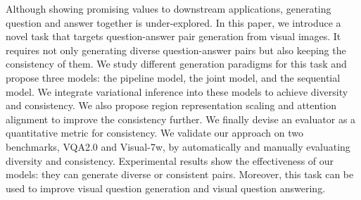 Although showing promising values to downstream applications, generating question and answer together is under-explored. In this paper, we introduce a novel task that targets question-answer pair generation from visual images. It requires not only generating diverse question-answer pairs but also keeping the consistency of them. We study different generation paradigms for this task and propose three models: the pipeline model, the joint model, and the sequential model. We integrate variational inference into these models to achieve diversity and consistency. We also propose region representation scaling and attention alignment to improve the consistency further. We finally devise an evaluator as a quantitative metric for consistency. We validate our approach on two benchmarks, VQA2.0 and Visual-7w, by automatically and manually evaluating diversity and consistency. Experimental results show the effectiveness of our models: they can generate diverse or consistent pairs. Moreover, this task can be used to improve visual question generation and visual question answering.
